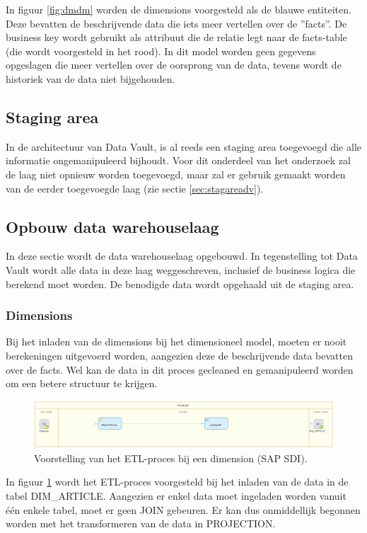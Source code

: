 In figuur \ref{fig:dmdm}  worden de dimensions voorgesteld als de blauwe entiteiten. Deze bevatten de beschrijvende data die iets meer vertellen over de ''facts''. De business key wordt gebruikt als attribuut die de relatie legt naar de facts-table (die wordt voorgesteld in het rood). In dit model worden geen gegevens opgeslagen die meer vertellen over de oorsprong van de data, tevens wordt de historiek van de data niet bijgehouden.

\subsection{Staging area}
In de architectuur van Data Vault, is al reeds een staging area toegevoegd die alle informatie ongemanipuleerd bijhoudt. Voor dit onderdeel van het onderzoek zal de laag niet opnieuw worden toegevoegd, maar zal er gebruik gemaakt worden van de eerder toegevoegde laag (zie sectie \ref{sec:stagareadv}).

\subsection{Opbouw data warehouselaag}
In deze sectie wordt de data warehouselaag opgebouwd. In tegenstelling tot Data Vault wordt alle data in deze laag weggeschreven, inclusief de business logica die berekend moet worden. De benodigde data wordt opgehaald uit de staging area.

\subsubsection{Dimensions}
Bij het inladen van de dimensions bij het dimensioneel model, moeten er nooit berekeningen uitgevoerd worden, aangezien deze de beschrijvende data bevatten over de facts. Wel kan de data in dit proces gecleaned en gemanipuleerd worden om een betere structuur te krijgen. 

\begin{figure}[h]
	\centering
	\includegraphics[scale=0.5]{../images/DM_FG_dim.png}
	\caption{Voorstelling van het ETL-proces bij een dimension (SAP SDI).}
	\label{fig:DM_FG_dim}
\end{figure}

In figuur \ref{fig:DM_FG_dim}  wordt het ETL-proces voorgesteld bij het inladen van de data in de tabel DIM\_ARTICLE. Aangezien er enkel data moet ingeladen worden vanuit één enkele tabel, moet er geen JOIN gebeuren. Er kan dus onmiddellijk begonnen worden met het transformeren van de data in PROJECTION. 


